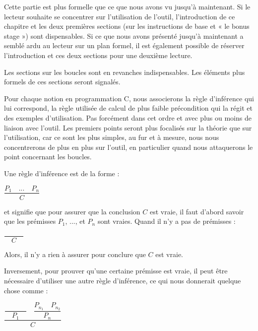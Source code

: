 

\begin{Information}
Cette partie est plus formelle que ce que nous avons vu jusqu'à maintenant. Si le
lecteur souhaite se concentrer sur l'utilisation de l'outil, l'introduction de
ce chapitre et les deux premières sections (sur les instructions de base et « le
bonus stage ») sont dispensables. Si ce que nous avons présenté jusqu'à maintenant
a semblé ardu au lecteur sur un plan formel, il est également possible de réserver
l'introduction et ces deux sections pour une deuxième lecture.

Les sections sur les boucles sont en revanches indispensables. Les éléments plus
formels de ces sections seront signalés.
\end{Information}


Pour chaque notion en programmation C, nous associerons la règle d'inférence qui
lui correspond, la règle utilisée de calcul de plus faible précondition qui la
régit et des exemples d'utilisation. Pas forcément dans cet ordre et avec plus ou
moins de liaison avec l'outil. Les premiers points seront plus focalisés sur la
théorie que sur l'utilisation, car ce sont les plus simples, au fur et à mesure,
nous nous concentrerons de plus en plus sur l'outil, en particulier quand nous
attaquerons le point concernant les boucles.





Une règle d'inférence est de la forme :
\begin{center}
$\dfrac{P_1 \quad ... \quad P_n}{C}$
\end{center}
et signifie que pour assurer que la conclusion $C$ est vraie, il faut d'abord
savoir que les prémisses $P_1$, ..., et $P_n$ sont vraies. Quand il n'y a
pas de prémisses :




\begin{center}
$\dfrac{}{\quad C \quad}$
\end{center}


Alors, il n'y a rien à assurer pour conclure que $C$ est vraie.



Inversement, pour prouver qu'une certaine prémisse est vraie, il peut être nécessaire
d'utiliser une autre règle d'inférence, ce qui nous donnerait quelque
chose comme :




\begin{center}
$\dfrac{\dfrac{}{\quad P_1\quad} \quad \dfrac{P_{n_1}\quad P_{n_2}}{P_n}}{C}$


\end{center}


